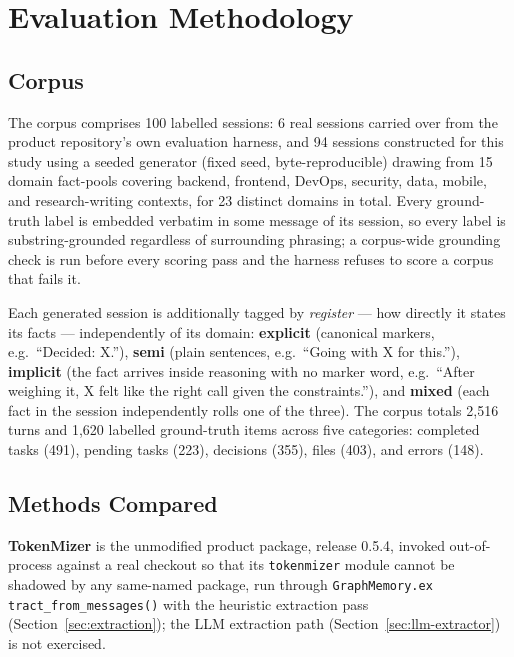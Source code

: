 \documentclass[journal]{IEEEtran}
\begin{document}
\section{Evaluation Methodology}
\label{sec:extended}

\subsection{Corpus}
\label{sec:extended-corpus}

The corpus comprises 100 labelled sessions: 6 real sessions
carried over from the product repository's own evaluation
harness, and 94 sessions constructed for this study using a
seeded generator (fixed seed, byte-reproducible) drawing from
15 domain fact-pools covering backend, frontend, DevOps,
security, data, mobile, and research-writing contexts, for 23
distinct domains in total.
Every ground-truth label is embedded verbatim in some message
of its session, so every label is substring-grounded
regardless of surrounding phrasing; a corpus-wide grounding
check is run before every scoring pass and the harness refuses
to score a corpus that fails it.

Each generated session is additionally tagged by
\emph{register} --- how directly it states its facts ---
independently of its domain:
\textbf{explicit} (canonical markers, e.g.\ ``Decided: X.''),
\textbf{semi} (plain sentences, e.g.\ ``Going with X for
this.''), \textbf{implicit} (the fact arrives inside reasoning
with no marker word, e.g.\ ``After weighing it, X felt like the
right call given the constraints.''), and \textbf{mixed} (each
fact in the session independently rolls one of the three).
The corpus totals 2{,}516 turns and 1{,}620 labelled
ground-truth items across five categories: completed tasks
(491), pending tasks (223), decisions (355), files (403), and
errors (148).

\subsection{Methods Compared}
\label{sec:extended-methods}

\textbf{TokenMizer} is the unmodified product package, release
0.5.4, invoked out-of-process against a real checkout so that
its \texttt{tokenmizer} module cannot be shadowed by any
same-named package, run through \texttt{GraphMemory.ex\allowbreak
tract\_from\_messages()} with the heuristic extraction pass
(Section~\ref{sec:extraction}); the LLM extraction path
(Section~\ref{sec:llm-extractor}) is not exercised.
\end{document}
